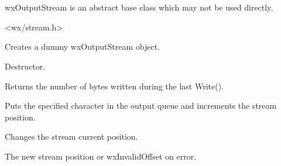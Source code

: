 \section{}\label{wxoutputstream}

wxOutputStream is an abstract base class which may not be used directly.




<wx/stream.h>




Creates a dummy wxOutputStream object.



Destructor.



Returns the number of bytes written during the last Write().



Puts the specified character in the output queue and increments the
stream position.

\label{wxoutputstreamseeko}


Changes the stream current position.





The new stream position or wxInvalidOffset on error.

